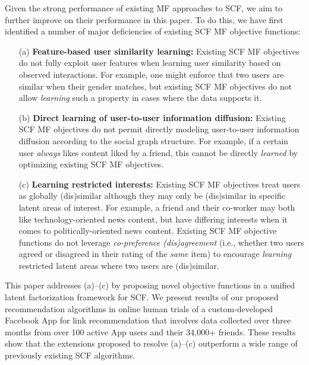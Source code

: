 Given the strong performance of existing MF approaches to SCF, we aim
to further improve on their performance in this paper.  To do this, we
have first identified a number of major deficiencies of existing SCF MF
objective functions:
\begin{enumerate}
\item[(a)] {\bf Feature-based user similarity learning:} Existing SCF
MF objectives do not fully exploit user features when learning user
similarity based on observed interactions.  For example, one might 
enforce that two users are similar when their gender matches, but
existing SCF MF objectives do not allow \emph{learning} such a
property in cases where the data supports it.
\item[(b)] {\bf Direct learning of user-to-user information
diffusion:} Existing SCF MF objectives do not permit directly modeling
user-to-user information diffusion according to the social graph
structure.  For example, if a certain user \emph{always} likes content
liked by a friend, this cannot be directly \emph{learned}
by optimizing existing SCF MF objectives.
\item[(c)] {\bf Learning restricted interests:} Existing SCF MF
objectives treat users as globally (dis)similar although they may only
be (dis)similar in specific latent areas of interest.  For example, a
friend and their co-worker may both like technology-oriented news
content, but have differing interests when it comes to
politically-oriented news content.  Existing SCF MF objective
functions do not leverage \emph{co-preference 
(dis)agreement} (i.e., whether two users agreed or disagreed in their
rating of the \emph{same} item) to encourage \emph{learning} restricted
latent areas where two users are (dis)similar.
\end{enumerate}

This paper addresses (a)--(c) by proposing novel objective functions
in a unified latent factorization framework for SCF.  We present
results of our proposed recommendation algorithms in online human
trials of a custom-developed Facebook App for link recommendation that
involves data collected over three months from over 100 active App
users and their 34,000+ friends.  These results show that the
extensions proposed to resolve (a)--(c) outperform a wide range of
previously existing SCF algorithms.


